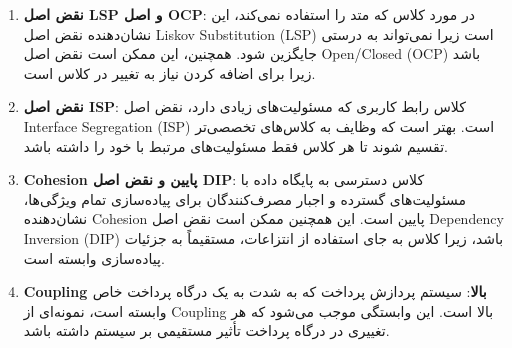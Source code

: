 \begin{enumerate}
	\item \textbf{نقض اصل LSP و اصل OCP}: در مورد کلاس  که متد  را استفاده نمی‌کند، این نشان‌دهنده نقض اصل Liskov Substitution (LSP) است زیرا  نمی‌تواند به درستی جایگزین  شود. همچنین، این ممکن است نقض اصل Open/Closed (OCP) باشد زیرا برای اضافه کردن  نیاز به تغییر در کلاس  است.
	
	\item \textbf{نقض اصل ISP}: کلاس رابط کاربری که مسئولیت‌های زیادی دارد، نقض اصل Interface Segregation (ISP) است. بهتر است که وظایف به کلاس‌های تخصصی‌تر تقسیم شوند تا هر کلاس فقط مسئولیت‌های مرتبط با خود را داشته باشد.
	
	\item \textbf{Cohesion پایین و نقض اصل DIP}: کلاس دسترسی به پایگاه داده با مسئولیت‌های گسترده و اجبار مصرف‌کنندگان برای پیاده‌سازی تمام ویژگی‌ها، نشان‌دهنده Cohesion پایین است. این همچنین ممکن است نقض اصل Dependency Inversion (DIP) باشد، زیرا کلاس به جای استفاده از انتزاعات، مستقیماً به جزئیات پیاده‌سازی وابسته است.
	
	\item \textbf{Coupling بالا}: سیستم پردازش پرداخت که به شدت به یک درگاه پرداخت خاص وابسته است، نمونه‌ای از Coupling بالا است. این وابستگی موجب می‌شود که هر تغییری در درگاه پرداخت تأثیر مستقیمی بر سیستم داشته باشد.
\end{enumerate}